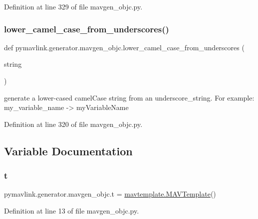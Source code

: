 Definition at line 329 of file mavgen\+\_\+objc.\+py.

\mbox{\label{namespacepymavlink_1_1generator_1_1mavgen__objc_ad0ae2d39d1f7d12c1178449325199d2d}} 
\subsubsection{\texorpdfstring{lower\_camel\_case\_from\_underscores()}{lower\_camel\_case\_from\_underscores()}}
{\footnotesize\ttfamily def pymavlink.\+generator.\+mavgen\+\_\+objc.\+lower\+\_\+camel\+\_\+case\+\_\+from\+\_\+underscores (\begin{DoxyParamCaption}\item[{}]{string }\end{DoxyParamCaption})}

\begin{DoxyVerb}generate a lower-cased camelCase string from an underscore_string.
For example: my_variable_name -> myVariableName\end{DoxyVerb}
 

Definition at line 320 of file mavgen\+\_\+objc.\+py.



\subsection{Variable Documentation}
\mbox{\label{namespacepymavlink_1_1generator_1_1mavgen__objc_a379787c6cbc3c99a94724d25039c0fbf}} 
\subsubsection{\texorpdfstring{t}{t}}
{\footnotesize\ttfamily pymavlink.\+generator.\+mavgen\+\_\+objc.\+t = \mbox{\hyperlink{classpymavlink_1_1generator_1_1mavtemplate_1_1MAVTemplate}{mavtemplate.\+M\+A\+V\+Template}}()}



Definition at line 13 of file mavgen\+\_\+objc.\+py.

